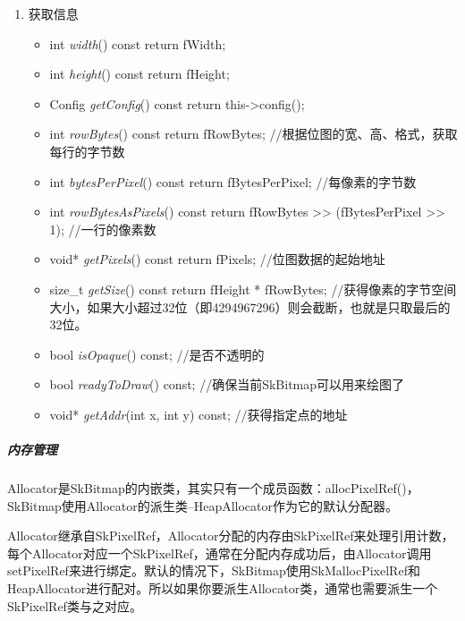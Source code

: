 \begin{enumerate}
\item 获取信息
  \begin{itemize}
  \item int \textit{width}() const { return fWidth; }
  \item int \textit{height}() const { return fHeight; }
  \item Config \textit{getConfig}() const { return this->config(); } 
  \item int \textit{rowBytes}() const { return fRowBytes; } //根据位图的宽、高、格式，获取每行的字节数
  \item int \textit{bytesPerPixel}() const { return fBytesPerPixel; } //每像素的字节数
  \item int \textit{rowBytesAsPixels}() const { return fRowBytes >> (fBytesPerPixel >> 1); } //一行的像素数
  \item void* \textit{getPixels}() const { return fPixels; } //位图数据的起始地址
  \item size\_t \textit{getSize}() const { return fHeight * fRowBytes; } //获得像素的字节空间大小，如果大小超过32位（即4294967296）则会截断，也就是只取最后的32位。
  \item bool \textit{isOpaque}() const; //是否不透明的
  \item bool \textit{readyToDraw}() const; //确保当前SkBitmap可以用来绘图了
  \item void* \textit{getAddr}(int x, int y) const; //获得指定点的地址
  \end{itemize}
\end{enumerate}

\subparagraph{内存管理}
\label{sec:skbitmap-mm}

Allocator是SkBitmap的内嵌类，其实只有一个成员函数：allocPixelRef()，SkBitmap使用Allocator的派生类--HeapAllocator作为它的默认分配器。

Allocator继承自SkPixelRef，Allocator分配的内存由SkPixelRef来处理引用计数，每个Allocator对应一个SkPixelRef，通常在分配内存成功后，由Allocator调用setPixelRef来进行绑定。默认的情况下，SkBitmap使用SkMallocPixelRef和HeapAllocator进行配对。所以如果你要派生Allocator类，通常也需要派生一个SkPixelRef类与之对应。

